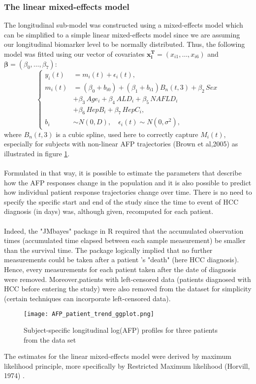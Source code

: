 \documentclass[11pt,twoside]{article}
\numberwithin{Theorem}{section}
\numberwithin{Definition}{section}
\numberwithin{Lemma}{section}
\numberwithin{Algorithm}{section}
\numberwithin{equation}{section}
\begin{document}
 \subsubsection{The linear mixed-effects model}
 The longitudinal sub-model was constructed using a mixed-effects model which can be simplified to a simple linear mixed-effects model since we are assuming our longitudinal biomarker level to be normally distributed.
 Thus, the following model was fitted using our vector of covariates $\mathbf{x_i^T}=(x_{i1},\dots,x_{i6})$ and $\mathbf{\beta}=(\beta_0,\dots,\beta_7)$:
\begin{equation}
\label{eq:MEM}
\left\{\begin{aligned}
y_i(t)&=m_i(t) + \epsilon_i(t),\\
m_i(t)&=(\beta_0+b_{i0})+(\beta_1+b_{i1})B_n(t,3)+\beta_2\, Sex\\
&+ \beta_3 \, Age_i +\beta_4 \, ALD_i +\beta_5 \, NAFLD_i \\
&+\beta_6 \, HepB_i +\beta_7 \, HepC_i,\\
b_i &\sim N(0,D),\quad \epsilon_i(t) \sim N(0,\sigma^{2}),
\end{aligned}
\right.
\end{equation}
  where $B_n(t,3)$ is a cubic spline, used here to correctly capture $M_i(t)$, especially for subjects with non-linear AFP trajectories (Brown et al,2005)\cite{brown2005flexible} as illustrated in figure \ref{fig:AFP_trend}.\\ \\
  Formulated in that way, it is possible to estimate the parameters that describe how the AFP responses change in the population and it is also possible to predict how individual patient response trajectories change over time. There is no need to specify the specific start and end of the study since the time to event of HCC diagnosis (in days) was, although given, recomputed for each patient. \\ \\
  Indeed, the "JMbayes" package in R \cite{rizopoulos2014r} required that the accumulated observation times (accumulated time elapsed between each sample measurement) be smaller than the survival time. The package logically implied that no further measurements could be taken after a patient 's "death" (here HCC diagnosis). Hence, every measurements for each patient taken after the date of diagnosis were removed. Moreover,patients with left-censored data (patients diagnosed with HCC before entering the study) were also removed from the dataset for simplicity (certain techniques can incorporate left-censored data).
  \begin{figure}[h!]
      \centering
      \texttt{[image: AFP\_patient\_trend\_ggplot.png]}
      \caption{Subject-specific longitudinal log(AFP) profiles for three patients from the data set}
      \label{fig:AFP_trend}
  \end{figure}
  The estimates for the linear mixed-effects model were derived by maximum likelihood principle, more specifically by Restricted Maximum likelihood (Horvill, 1974) \cite{harville1974bayesian}. \\ \\
\end{document}
